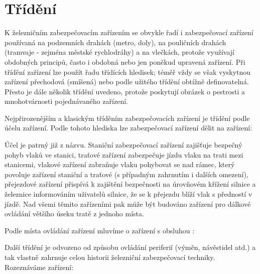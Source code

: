{\section{Třídění}
  K železničním zabezpečovacím zařízením se obvykle řadí i zabezpečovací zařízení používaná na
  podzemních drahách (metro, doly), na pouličních drahách (tramvaje - zejména městské rychlodráhy) 
  a na vlečkách, protože využívají obdobných principů, často i obdobná nebo jen poněkud upravená 
  zařízení. Při třídění zařízení lze použít řadu třídících hledisek; téměř vždy se však vyskytnou 
  zařízení přechodová (smíšená) nebo podle užitého třídění obtížně definovatelná. Přesto je dále 
  několik třídění uvedeno, protože poskytují obrázek o pestrosti a mnohotvárnosti pojednávaného 
  zařízení. 
  
  Nejpřirozenějším a klasickým tříděním zabezpečovacích zařízení je třídění podle účelu zařízení.
  Podle tohoto hlediska lze zabezpečovací zařízení dělit na zařízení:
  \begin{center}
  \end{center}
  
  Účel je patrný již z názvu. Staniční zabezpečovací zařízení zajišťuje bezpečný pohyb vlaků ve 
  stanici, traťové zařízení zabezpečuje jízdu vlaku na trati mezi stanicemi, vlakové zařízení 
  zabraňuje vlaku pohybovat se nad rámec, který povoluje zařízení staniční a traťové (s případným 
  zahrnutím i dalších omezení), přejezdové zařízení přispívá k zajištění bezpečnosti na úrovňovém 
  křížení silnice a železnice informováním uživatelů silnice, že se k přejezdu blíží vlak s 
  předností v jízdě. Nad všemi těmito zařízeními pak může být budováno zařízení pro dálkové 
  ovládání většího úseku tratě z jednoho místa. 
  
  Podle místa ovládání zařízení mluvíme o zařízení s obsluhou :
  \begin{center}
  \end{center}
  

  Další třídění je odvozeno od způsobu ovládání periferií (výměn, návěstidel atd.) a tak vlastně
  zahrnuje celou historii železniční zabezpečovací techniky. Rozeznáváme zařízení:
  \begin{center}
  \end{center}

}

